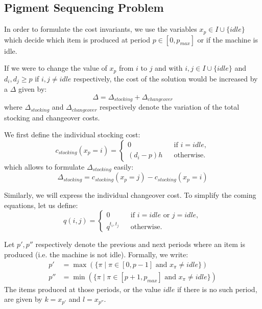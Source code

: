 \subsection{Pigment Sequencing Problem}

In order to formulate the cost invariants, we use the variables $x_p \in I \cup \{ idle \}$
which decide which item is produced at period $p \in [0,p_{max}]$ or if the machine is idle.


If we were to change the value of $x_p$ from $i$ to $j$ and with $i,j \in I \cup \{ idle \}$
and $d_i, d_j \ge p$ if $i,j \ne idle$ respectively,
the cost of the solution would be increased by a $\Delta$ given by:
\begin{equation}
    \Delta = \Delta_{stocking} + \Delta_{changeover}
\end{equation}
where $\Delta_{stocking}$ and $\Delta_{changeover}$ respectively denote the variation of the total stocking and changeover costs.

We first define the individual stocking cost:
\begin{equation}
    c_{stocking}(x_p = i) = \left\{ \begin{array}{lcl}
        0 && \text{if }i=idle, \\
        (d_i - p) h && \text{otherwise}.
    \end{array} \right.
\end{equation}
which allows to formulate $\Delta_{stocking}$ easily:
\begin{equation}
    \Delta_{stocking} = c_{stocking}(x_p = j) - c_{stocking}(x_p = i)
\end{equation}

Similarly, we will express the individual changeover cost.
To simplify the coming equations, let us define:
\begin{equation}
    q(i,j) = \left\{ \begin{array}{lcl}
        0 && \text{if }i=idle\text{ or }j=idle, \\
        q^{t_i,t_j} && \text{otherwise}.
    \end{array} \right.
\end{equation}

Let $p',p''$ respectively denote the previous and next periods where an item is produced (i.e. the machine is not idle).
Formally, we write:
\begin{align}
    p' &= \max \left(\{ \pi \mid \pi \in [0,p-1] \text{ and } x_\pi \ne idle \} \right) \\
    p'' &= \min \left(\{ \pi \mid \pi \in [p+1,p_{max}] \text{ and } x_\pi \ne idle \} \right)
\end{align}
The items produced at those periods, or the value $idle$ if there is no such period, are given by $k = x_{p'}$ and $l = x_{p''}$.

